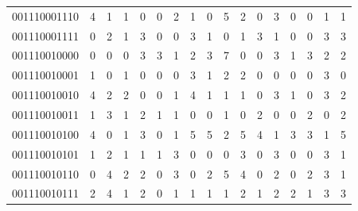 \documentclass[10pt,a4paper]{article}
\begin{document}
\begin{longtable}{ |c|c|c|c|c|c|c|c|c|c|c|c|c|c|c|c|c| }
    001110001110              & 4                            & 1                                & 1                            & 0                              & 0   & 2   & 1   & 0   & 5   & 2   & 0   & 3   & 0   & 0   & 1   & 1   \\
    001110001111              & 0                            & 2                                & 1                            & 3                              & 0   & 0   & 3   & 1   & 0   & 1   & 3   & 1   & 0   & 0   & 3   & 3   \\
    001110010000              & 0                            & 0                                & 0                            & 3                              & 3   & 1   & 2   & 3   & 7   & 0   & 0   & 3   & 1   & 3   & 2   & 2   \\
    001110010001              & 1                            & 0                                & 1                            & 0                              & 0   & 0   & 3   & 1   & 2   & 2   & 0   & 0   & 0   & 0   & 3   & 0   \\
    001110010010              & 4                            & 2                                & 2                            & 0                              & 0   & 1   & 4   & 1   & 1   & 1   & 0   & 3   & 1   & 0   & 3   & 2   \\
    001110010011              & 1                            & 3                                & 1                            & 2                              & 1   & 1   & 0   & 0   & 1   & 0   & 2   & 0   & 0   & 2   & 0   & 2   \\
    001110010100              & 4                            & 0                                & 1                            & 3                              & 0   & 1   & 5   & 5   & 2   & 5   & 4   & 1   & 3   & 3   & 1   & 5   \\
    001110010101              & 1                            & 2                                & 1                            & 1                              & 1   & 3   & 0   & 0   & 0   & 3   & 0   & 3   & 0   & 0   & 3   & 1   \\
    001110010110              & 0                            & 4                                & 2                            & 2                              & 0   & 3   & 0   & 2   & 5   & 4   & 0   & 2   & 0   & 2   & 3   & 1   \\
    001110010111              & 2                            & 4                                & 1                            & 2                              & 0   & 1   & 1   & 1   & 1   & 2   & 1   & 2   & 2   & 1   & 3   & 3   \\

\end{longtable}
\end{document}
